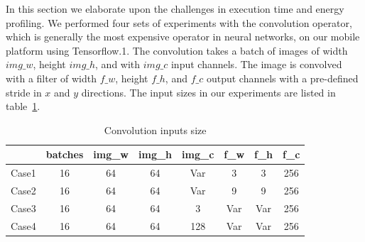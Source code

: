 \documentclass[conference,9pt]{IEEEtran}
\begin{document}
In this section we elaborate upon the challenges in execution time and energy profiling.
We performed four sets of experiments with the convolution operator, which is generally the most expensive operator in neural networks, on our mobile platform using Tensorflow.1\cite{b11}. The convolution takes a batch of images of width $img\_w$, height $img\_h$, and with $img\_c$ input channels. The image is convolved with a filter of width $f\_w$, height $f\_h$, and $f\_c$ output channels with a pre-defined stride in $x$ and $y$ directions. The input sizes in our experiments are listed in table~\ref{nonlin_inputs}.
\begin{table}[!ht]
\caption{Convolution inputs size} %
\label{nonlin_inputs} %
\centering %
\begin{tabular}{|c|c|c|c|c|c|c|c|} %
\cline{2-8}
\multicolumn{1}{c|}{} & \textbf{batches} & \textbf{img\_w} & \textbf{img\_h} & \textbf{img\_c} & \textbf{f\_w} & \textbf{f\_h} & \textbf{f\_c} \\ [0.5ex] %
\hline %
Case1 & 16 & 64 & 64 & Var & 3 & 3 & 256 \\
\hline %
Case2 & 16 & 64 & 64 & Var & 9 & 9 & 256 \\
\hline %
Case3 & 16 & 64 & 64 & 3 & Var & Var & 256 \\
\hline %
Case4 & 16 & 64 & 64 & 128 & Var & Var & 256 \\
\hline %
\end{tabular}
\end{table}
\end{document}

